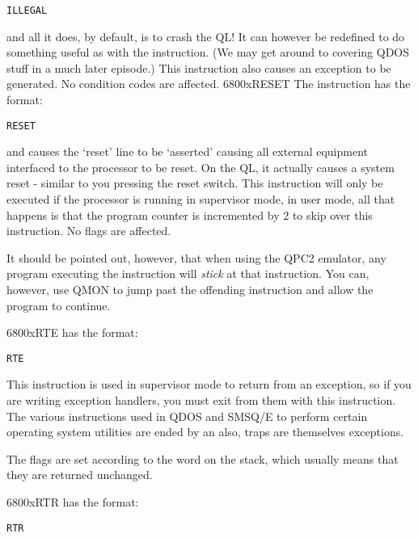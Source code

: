 \begin{lstlisting}[firstnumber=1,]
          ILLEGAL
\end{lstlisting}

and all it does, by default, is to crash the QL! It can however
      be redefined to do something useful as with the  instruction. (We may
      get around to covering QDOS stuff in a much later episode.) This
      instruction also causes an exception to be generated. No condition codes
      are affected.
\mc6800x{RESET}
The  instruction has the format:

\begin{lstlisting}[firstnumber=1,]
          RESET
\end{lstlisting}

and causes the `reset' line to be `asserted' causing all external
      equipment interfaced to the processor to be reset. On the QL, it
      actually causes a system reset -{} similar to you pressing the reset
      switch. This instruction will only be executed if the processor is
      running in supervisor mode, in user mode, all that happens is that the
      program counter is incremented by 2 to skip over this instruction. No
      flags are affected.

It should be pointed out, however, that when using the QPC2 emulator, any program executing the  instruction will \emph{stick} at that instruction. You can, however, use QMON to jump past the offending instruction and allow the program to continue.

\mc6800x{RTE}
 has the format:

\begin{lstlisting}[firstnumber=1,]
          RTE
\end{lstlisting}

This instruction is used in supervisor mode to return from an exception, so if you are writing exception handlers, you must exit from them with this instruction. The various  instructions used in QDOS and SMSQ/E to perform certain operating system utilities are ended by an  also, traps are themselves exceptions.

The flags are set according to the word on the stack, which usually means that they are returned unchanged.

\mc6800x{RTR}
 has the format:

\begin{lstlisting}[firstnumber=1,]
          RTR
\end{lstlisting}

